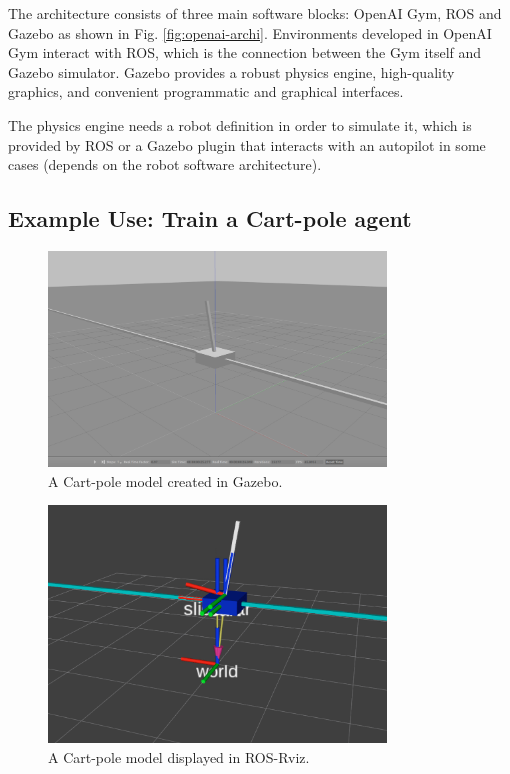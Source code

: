 The architecture consists of three main software blocks: OpenAI Gym, ROS and Gazebo as shown in Fig. \ref{fig:openai-archi}. Environments developed in OpenAI Gym interact with ROS, which is the connection between the Gym itself and Gazebo simulator. Gazebo provides a robust physics engine, high-quality graphics, and convenient programmatic and graphical interfaces.

The physics engine needs a robot definition in order to simulate it, which is provided by ROS or a Gazebo plugin that interacts with an autopilot in some cases (depends on the robot software architecture).

\subsection{Example Use: Train a Cart-pole agent}

\begin{figure}[h]
\centering
\includegraphics[width=0.8\textwidth]{figs/ch2/cartpole-in-gazebo}
\caption{A Cart-pole model created in Gazebo.}
\label{fig:cartpole-in-gazebo}
\end{figure}

\begin{figure}[h]
\centering
\includegraphics[width=0.8\textwidth]{figs/ch2/cartpole-in-rviz}
\caption{A Cart-pole model displayed in ROS-Rviz.}
\label{fig:cartpole-in-rviz}
\end{figure}

